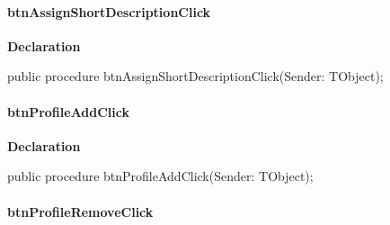 \documentclass{report}
\newif\ifpdf
\begin{document}
\paragraph*{btnAssignShortDescriptionClick}\hspace*{\fill}

\label{prjwizard.TfrmProjectWizard-btnAssignShortDescriptionClick}
\begin{list}{}{
\setlength{\itemindent}{0cm}
\setlength{\listparindent}{0cm}
\setlength{\leftmargin}{\evensidemargin}
\addtolength{\leftmargin}{\tmplength}
\settowidth{\labelsep}{X}
\addtolength{\leftmargin}{\labelsep}
\setlength{\labelwidth}{\tmplength}
}
\item[\textbf{Declaration}\hfill]
\ifpdf
\begin{flushleft}
\fi
\begin{ttfamily}
public procedure btnAssignShortDescriptionClick(Sender: TObject);\end{ttfamily}

\ifpdf
\end{flushleft}
\fi

\end{list}
\paragraph*{btnProfileAddClick}\hspace*{\fill}

\label{prjwizard.TfrmProjectWizard-btnProfileAddClick}
\begin{list}{}{
\setlength{\itemindent}{0cm}
\setlength{\listparindent}{0cm}
\setlength{\leftmargin}{\evensidemargin}
\addtolength{\leftmargin}{\tmplength}
\settowidth{\labelsep}{X}
\addtolength{\leftmargin}{\labelsep}
\setlength{\labelwidth}{\tmplength}
}
\item[\textbf{Declaration}\hfill]
\ifpdf
\begin{flushleft}
\fi
\begin{ttfamily}
public procedure btnProfileAddClick(Sender: TObject);\end{ttfamily}

\ifpdf
\end{flushleft}
\fi

\end{list}
\paragraph*{btnProfileRemoveClick}\hspace*{\fill}
\end{document}
